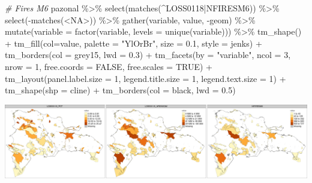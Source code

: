 \documentclass[10pt,landscape,a3paper]{article}
\newenvironment{Shaded}{\begin{snugshade}}{\end{snugshade}}
\newcommand{\AttributeTok}[1]{\textcolor[rgb]{0.77,0.63,0.00}{#1}}
\newcommand{\CommentTok}[1]{\textcolor[rgb]{0.56,0.35,0.01}{\textit{#1}}}
\newcommand{\ConstantTok}[1]{\textcolor[rgb]{0.00,0.00,0.00}{#1}}
\newcommand{\DecValTok}[1]{\textcolor[rgb]{0.00,0.00,0.81}{#1}}
\newcommand{\FloatTok}[1]{\textcolor[rgb]{0.00,0.00,0.81}{#1}}
\newcommand{\FunctionTok}[1]{\textcolor[rgb]{0.00,0.00,0.00}{#1}}
\newcommand{\NormalTok}[1]{#1}
\newcommand{\SpecialCharTok}[1]{\textcolor[rgb]{0.00,0.00,0.00}{#1}}
\newcommand{\StringTok}[1]{\textcolor[rgb]{0.31,0.60,0.02}{#1}}
\begin{document}
\begin{Shaded}
\begin{Highlighting}[]

\CommentTok{\# Fires M6}
\NormalTok{pazonal }\SpecialCharTok{\%\textgreater{}\%} \FunctionTok{select}\NormalTok{(}\FunctionTok{matches}\NormalTok{(}\StringTok{\textquotesingle{}\^{}LOSS0118|NFIRESM6\textquotesingle{}}\NormalTok{)) }\SpecialCharTok{\%\textgreater{}\%} \FunctionTok{select}\NormalTok{(}\SpecialCharTok{{-}}\FunctionTok{matches}\NormalTok{(}\StringTok{\textquotesingle{}\textless{}NA\textgreater{}\textquotesingle{}}\NormalTok{)) }\SpecialCharTok{\%\textgreater{}\%} 
  \FunctionTok{gather}\NormalTok{(variable, value, }\SpecialCharTok{{-}}\NormalTok{geom) }\SpecialCharTok{\%\textgreater{}\%}
  \FunctionTok{mutate}\NormalTok{(}\AttributeTok{variable =} \FunctionTok{factor}\NormalTok{(variable, }\AttributeTok{levels =} \FunctionTok{unique}\NormalTok{(variable))) }\SpecialCharTok{\%\textgreater{}\%} 
  \FunctionTok{tm\_shape}\NormalTok{() }\SpecialCharTok{+}
  \FunctionTok{tm\_fill}\NormalTok{(}\AttributeTok{col=}\StringTok{\textquotesingle{}value\textquotesingle{}}\NormalTok{, }\AttributeTok{palette =} \StringTok{"YlOrBr"}\NormalTok{, }\AttributeTok{size =} \FloatTok{0.1}\NormalTok{, }\AttributeTok{style =} \StringTok{\textquotesingle{}jenks\textquotesingle{}}\NormalTok{) }\SpecialCharTok{+}
  \FunctionTok{tm\_borders}\NormalTok{(}\AttributeTok{col =} \StringTok{\textquotesingle{}grey15\textquotesingle{}}\NormalTok{, }\AttributeTok{lwd =} \FloatTok{0.3}\NormalTok{) }\SpecialCharTok{+}
  \FunctionTok{tm\_facets}\NormalTok{(}\AttributeTok{by =} \StringTok{"variable"}\NormalTok{, }\AttributeTok{ncol =} \DecValTok{3}\NormalTok{, }\AttributeTok{nrow =} \DecValTok{1}\NormalTok{, }\AttributeTok{free.coords =} \ConstantTok{FALSE}\NormalTok{, }\AttributeTok{free.scales =} \ConstantTok{TRUE}\NormalTok{) }\SpecialCharTok{+}
  \FunctionTok{tm\_layout}\NormalTok{(}\AttributeTok{panel.label.size =} \DecValTok{1}\NormalTok{, }\AttributeTok{legend.title.size =} \DecValTok{1}\NormalTok{, }\AttributeTok{legend.text.size =} \DecValTok{1}\NormalTok{) }\SpecialCharTok{+} 
  \FunctionTok{tm\_shape}\NormalTok{(}\AttributeTok{shp =}\NormalTok{ cline) }\SpecialCharTok{+} \FunctionTok{tm\_borders}\NormalTok{(}\AttributeTok{col =} \StringTok{\textquotesingle{}black\textquotesingle{}}\NormalTok{, }\AttributeTok{lwd =} \FloatTok{0.5}\NormalTok{)}
\end{Highlighting}
\end{Shaded}

\begin{center}\includegraphics{img/zonal-pa-8} \end{center}
\end{document}
